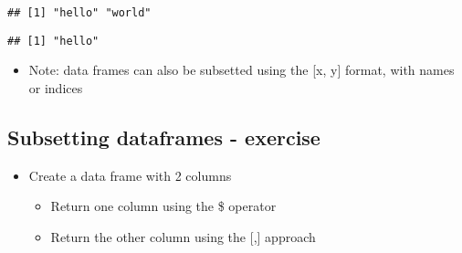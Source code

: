 \documentclass[]{article}
\newenvironment{Shaded}{\begin{snugshade}}{\end{snugshade}}
\newcommand{\KeywordTok}[1]{\textcolor[rgb]{0.13,0.29,0.53}{\textbf{#1}}}
\newcommand{\DataTypeTok}[1]{\textcolor[rgb]{0.13,0.29,0.53}{#1}}
\newcommand{\DecValTok}[1]{\textcolor[rgb]{0.00,0.00,0.81}{#1}}
\newcommand{\StringTok}[1]{\textcolor[rgb]{0.31,0.60,0.02}{#1}}
\newcommand{\OtherTok}[1]{\textcolor[rgb]{0.56,0.35,0.01}{#1}}
\newcommand{\OperatorTok}[1]{\textcolor[rgb]{0.81,0.36,0.00}{\textbf{#1}}}
\newcommand{\NormalTok}[1]{#1}
\providecommand{\tightlist}{%
  \setlength{\itemsep}{0pt}\setlength{\parskip}{0pt}}
\begin{document}
\begin{verbatim}
## [1] "hello" "world"
\end{verbatim}

\begin{Shaded}
\end{Shaded}

\begin{verbatim}
## [1] "hello"
\end{verbatim}

\begin{itemize}
\tightlist
\item
  Note: data frames can also be subsetted using the {[}x, y{]} format,
  with names or indices
\end{itemize}

\subsection{Subsetting dataframes -
exercise}\label{subsetting-dataframes---exercise}

\begin{itemize}
\tightlist
\item
  Create a data frame with 2 columns

  \begin{itemize}
  \tightlist
  \item
    Return one column using the \$ operator
  \item
    Return the other column using the {[},{]} approach
  \end{itemize}
\end{itemize}

\begin{Shaded}
\end{Shaded}
\end{document}
